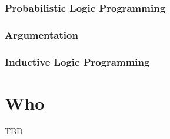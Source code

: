 \documentclass[12pt,a4paper,openright,twoside]{book}
\begin{document}
\section{Probabilistic Logic Programming}

\section{Argumentation}

\section{Inductive Logic Programming}

\part{Who}
\label{part:who}

TBD




\end{document}
